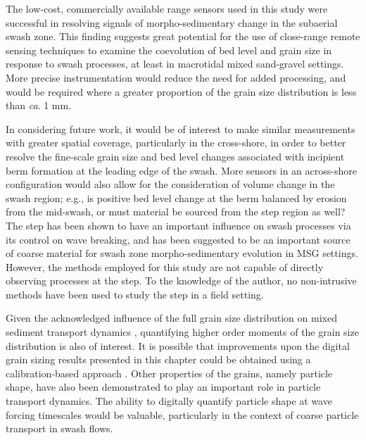 
The low-cost, commercially available range sensors used in this study were successful in resolving signals of morpho-sedimentary change in the subaerial swash zone. This finding suggests great potential for the use of close-range remote sensing techniques to examine the coevolution of bed level and grain size in response to swash processes, at least in macrotidal mixed sand-gravel settings. More precise instrumentation would reduce the need for added processing, and would be required where a greater proportion of the grain size distribution is less than \textit{ca}. 1 mm.

In considering future work, it would be of interest to make similar measurements with greater spatial coverage, particularly in the cross-shore, in order to better resolve the fine-scale grain size and bed level changes associated with incipient berm formation at the leading edge of the swash. More sensors in an across-shore configuration would also allow for the consideration of volume change in the swash region; e.g., is positive bed level change at the berm balanced by erosion from the mid-swash, or must material be sourced from the step region as well? The step has been shown to have an important influence on swash processes via its control on wave breaking, and has been suggested to be an important source of coarse material for swash zone morpho-sedimentary evolution in MSG settings. However, the methods employed for this study are not capable of directly observing processes at the step. To the knowledge of the author, no non-intrusive methods have been used to study the step in a field setting. 

Given the acknowledged influence of the full grain size distribution on mixed sediment transport dynamics \cite[e.g., the increased mobility of gravel-sized particles in the presence of a large sand fraction;][]{Wilcock_etal2001}, quantifying higher order moments of the grain size distribution is also of interest. It is possible that improvements upon the digital grain sizing results presented in this chapter could be obtained using a calibration-based approach \citep[e.g.,][]{Warrick_etal2009}. Other properties of the grains, namely particle shape, have also been demonstrated to play an important role in particle transport dynamics. The ability to digitally quantify particle shape at wave forcing timescales would be valuable, particularly in the context of coarse particle transport in swash flows.

